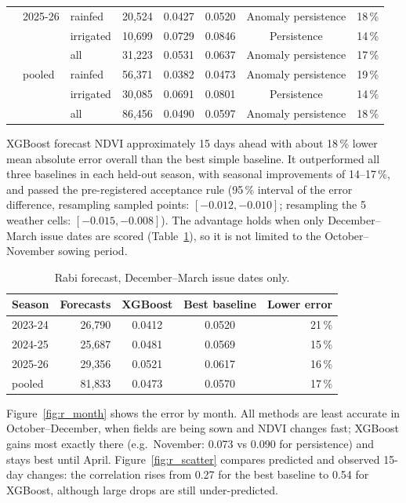 \documentclass[11pt,a4paper,oneside]{article}
\begin{document}
\begin{table}[H]
\begin{tabular}{@{}lllrcccr@{}}
 & 2025-26 & rainfed & 20,524 & 0.0427 & 0.0520 & Anomaly persistence & 18\,\% \\
 &  & irrigated & 10,699 & 0.0729 & 0.0846 & Persistence & 14\,\% \\
 &  & all & 31,223 & 0.0531 & 0.0637 & Anomaly persistence & 17\,\% \\
 & pooled & rainfed & 56,371 & 0.0382 & 0.0473 & Anomaly persistence & 19\,\% \\
 &  & irrigated & 30,085 & 0.0691 & 0.0801 & Persistence & 14\,\% \\
 &  & all & 86,456 & 0.0490 & 0.0597 & Anomaly persistence & 18\,\% \\
\bottomrule
\end{tabular}
\end{table}


XGBoost forecast NDVI approximately 15 days ahead with about 18\,\% lower mean absolute error overall than the best simple baseline. It outperformed all three baselines in each held-out season, with seasonal improvements of 14--17\,\%, and passed the pre-registered acceptance rule (95\,\% interval of the error difference, resampling sampled points: $[-0.012, -0.010]$; resampling the 5 weather cells: $[-0.015, -0.008]$). The advantage holds when only December--March issue dates are scored (Table~\ref{tab:r_decmar}), so it is not limited to the October--November sowing period.

\begin{table}[H]
\centering
\caption{Rabi forecast, December--March issue dates only.}
\label{tab:r_decmar}
\footnotesize
\begin{tabular}{@{}lrccr@{}}
\toprule
\textbf{Season} & \textbf{Forecasts} & \textbf{XGBoost} & \textbf{Best baseline} & \textbf{Lower error} \\
\midrule
2023-24 & 26,790 & 0.0412 & 0.0520 & 21\,\% \\
2024-25 & 25,687 & 0.0481 & 0.0569 & 15\,\% \\
2025-26 & 29,356 & 0.0521 & 0.0617 & 16\,\% \\
pooled & 81,833 & 0.0473 & 0.0570 & 17\,\% \\
\bottomrule
\end{tabular}
\end{table}


Figure~\ref{fig:r_month} shows the error by month. All methods are least accurate in October--December, when fields are being sown and NDVI changes fast; XGBoost gains most exactly there (e.g.\ November: 0.073 vs 0.090 for persistence) and stays best until April. Figure~\ref{fig:r_scatter} compares predicted and observed 15-day changes: the correlation rises from 0.27 for the best baseline to 0.54 for XGBoost, although large drops are still under-predicted.
\end{document}
